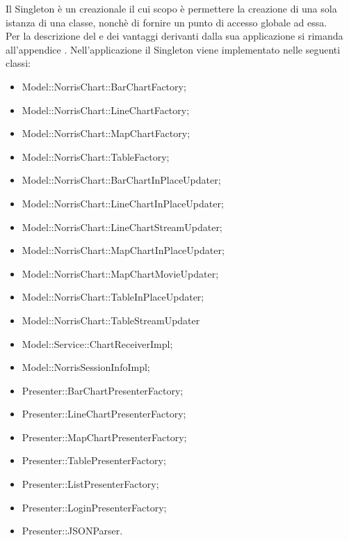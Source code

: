             Il Singleton è un  creazionale il cui scopo è permettere la creazione di una sola istanza di una classe, nonchè di fornire un punto di accesso globale ad essa.\\
            Per la descrizione del  e dei vantaggi derivanti dalla sua applicazione si rimanda all'appendice .
                Nell'applicazione  il Singleton viene implementato nelle seguenti classi:
                \begin{itemize}
                        \item Model::NorrisChart::BarChartFactory;
                        \item Model::NorrisChart::LineChartFactory;
                        \item Model::NorrisChart::MapChartFactory;
                        \item Model::NorrisChart::TableFactory;
                        \item Model::NorrisChart::BarChartInPlaceUpdater;
						\item Model::NorrisChart::LineChartInPlaceUpdater;
						\item Model::NorrisChart::LineChartStreamUpdater;
						\item Model::NorrisChart::MapChartInPlaceUpdater;
						\item Model::NorrisChart::MapChartMovieUpdater;
						\item Model::NorrisChart::TableInPlaceUpdater;
						\item Model::NorrisChart::TableStreamUpdater
                        \item Model::Service::ChartReceiverImpl;
                        \item Model::NorrisSessionInfoImpl;
                        \item Presenter::BarChartPresenterFactory;
                        \item Presenter::LineChartPresenterFactory;
                        \item Presenter::MapChartPresenterFactory;
                        \item Presenter::TablePresenterFactory;
                        \item Presenter::ListPresenterFactory;
                        \item Presenter::LoginPresenterFactory;
                        \item Presenter::JSONParser.
                    \end{itemize}
